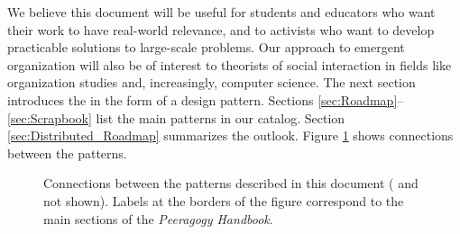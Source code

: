 We believe this document will be useful for students and educators who want their work to have real-world relevance, and to activists who want to develop practicable solutions to large-scale problems.   Our approach to emergent organization will also be of interest to theorists of social interaction in fields like organization studies and, increasingly, computer science.  The next section introduces the  in the form of a design pattern.  Sections \ref{sec:Roadmap}--\ref{sec:Scrapbook} list the main patterns in our catalog.  Section \ref{sec:Distributed_Roadmap} summarizes the outlook.  Figure \ref{fig:connections} shows connections between the patterns.

\begin{figure}
\vspace{-.9in}
{\centering


\par
}
\vspace{-.9in}
\caption{Connections between the patterns described in this document ( and  not shown).  Labels at the borders of the figure correspond to the main sections of the \emph{Peeragogy Handbook}.\label{fig:connections}}
\end{figure}

